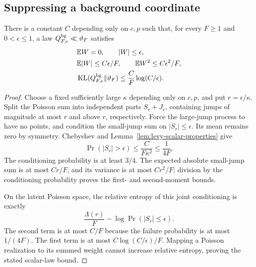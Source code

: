 \subsection{Suppressing a background coordinate}
\begin{lemma}
\label{lem:levy-background}
There is a constant $C$ depending only on $c,p$ such that, for every $F\ge1$ and $0<\epsilon\le1$, a law $Q_{F,\epsilon}^{\rm bg}\ll\vartheta_F$ satisfies
\begin{align*}
 &\mathbb E W=0,\qquad |W|\le\epsilon,\\
 &\mathbb E|W|\le C\epsilon/F,\qquad
   \mathbb E W^2\le C\epsilon^2/F,\\
 &\operatorname{KL}(Q_{F,\epsilon}^{\rm bg}\|\vartheta_F)
       \le\frac C F\log(C/\epsilon).
\end{align*}
\end{lemma}
\begin{proof}
Choose a fixed sufficiently large $\kappa$ depending only on $c,p$, and put $r=\epsilon/\kappa$. Split the Poisson sum into independent parts $S_r+J_r$, containing jumps of magnitude at most $r$ and above $r$, respectively. Force the large-jump process to have no points, and condition the small-jump sum on $|S_r|\le\epsilon$. Its mean remains zero by symmetry. Chebyshev and Lemma~\ref{lem:levy-scalar-properties} give
\[
 \Pr(|S_r|>\epsilon)
 \le\frac C{F\kappa^2}\le\frac1{4F}.
\]
The conditioning probability is at least $3/4$. The expected absolute small-jump sum is at most $Cr/F$, and its variance is at most $Cr^2/F$; division by the conditioning probability proves the first- and second-moment bounds.

On the latent Poisson space, the relative entropy of this joint conditioning is exactly
\[
 \frac{\Lambda(r)}F-
            \log\Pr(|S_r|\le\epsilon).
\]
The second term is at most $C/F$ because the failure probability is at most $1/(4F)$. The first term is at most $C\log(C/\epsilon)/F$. Mapping a Poisson realization to its summed weight cannot increase relative entropy, proving the stated scalar-law bound.
\end{proof}

